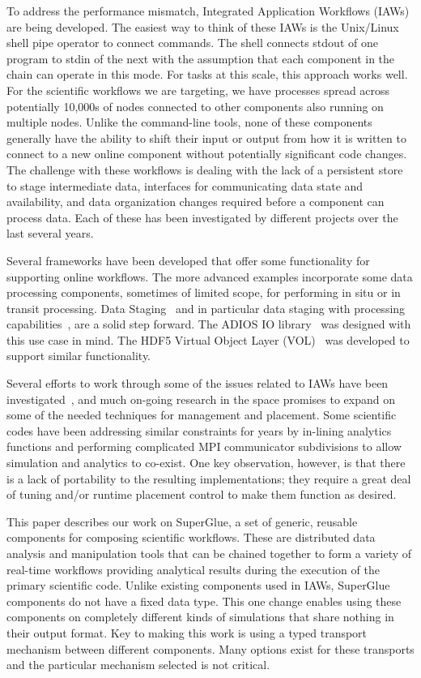 \documentclass[conference]{IEEEtran}
\begin{document}
To address the performance mismatch, Integrated Application Workflows (IAWs)
are being developed. The easiest way to think of these IAWs is the Unix/Linux
shell pipe operator to connect commands. The shell connects stdout of one
program to stdin of the next with the assumption that each component in the
chain can operate in this mode. For tasks at this scale, this approach works
well. For the scientific workflows we are targeting, we have processes spread
across potentially 10,000s of nodes connected to other components also running
on multiple nodes. Unlike the command-line tools, none of these components
generally have the ability to shift their input or output from how it is
written to connect to a new online component without potentially significant
code changes. The challenge with these workflows is dealing with the lack of a
persistent store to stage intermediate data, interfaces for communicating data
state and availability, and data organization changes required before a
component can process data.  Each of these has been investigated by different
projects over the last several years.

Several frameworks have been developed that offer some functionality for
supporting online workflows. The more advanced examples incorporate some data
processing components, sometimes of limited scope, for performing in situ or in
transit processing. Data Staging~\cite{nisar:2008:staging} and in particular
data staging with processing
capabilities~\cite{abbasi:2009:datastaging,ober:seismic}, are a solid step
forward. The ADIOS IO library~\cite{lofstead:2009:adaptable} was designed with
this use case in mind. The HDF5 Virtual Object Layer
(VOL)~\cite{chaarawi:2013:hdf5-vol} was developed to support similar
functionality.

Several efforts to work through some of the issues related to IAWs have been
investigated~\cite{karimabadi:2013:catalyst,whitlock:2011:libsim,Glean,Flexpath,dreher:2016:bredala,zheng:2010:predata},
and much on-going research in the space promises to expand on some of the
needed techniques for management and placement.  Some
scientific codes have been addressing similar constraints for years by
in-lining analytics functions and performing complicated MPI communicator
subdivisions to allow simulation and analytics to co-exist.  One key
observation, however, is that there is a lack of portability to the resulting
implementations; they require a great deal of tuning and/or runtime placement
control to make them function as desired.

This paper describes our work on SuperGlue, a set of generic, reusable
components for composing scientific workflows. These are distributed data
analysis and manipulation tools that can be chained together to form a variety
of real-time workflows providing analytical results during the execution of the
primary scientific code.  Unlike existing components used in IAWs, SuperGlue
components do not have a fixed data type.  This one change enables using these
components on completely different kinds of simulations that share nothing in
their output format. Key to making this work is using a typed transport
mechanism between different components. Many options exist for these transports
and the particular mechanism selected is not critical. 
\end{document}
